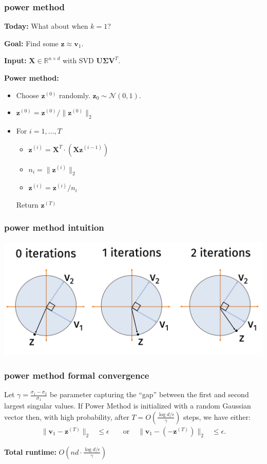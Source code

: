 \documentclass[compress]{beamer}
\newcommand{\bs}[1]{\boldsymbol{#1}}
\newcommand{\bv}[1]{\mathbf{#1}}
\newcommand{\R}{\mathbb{R}}
\begin{document}
\begin{frame}[t]
	\frametitle{power method}
	\textbf{Today:} What about when $k = 1$? 
	
	\textbf{Goal:} Find some $\bv{z} \approx \bv{v}_1$. 
	
	\textbf{Input:} $\bv{X} \in \R^{n\times d}$ with SVD $\bv{U}\bs{\Sigma}\bv{V}^T$. 
	
	\vspace{2em}
	\textbf{Power method:}
	\begin{itemize}
		\item Choose $\bv{z}^{(0)}$ randomly. $\bv{z}_0 \sim \mathcal{N}(0,1)$.
		\item $\bv{z}^{(0)} = \bv{z}^{(0)} /\|\bv{z}^{(0)}\|_2$
		\item For $i = 1,\ldots, T$
		\begin{itemize}
			\item $\bv{z}^{(i)} = \bv{X}^T\cdot(\bv{X}\bv{z}^{(i-1)} )$
			\item $n_i = \|\bv{z}^{(i)}\|_2$
			\item $\bv{z}^{(i)}  = \bv{z}^{(i)} /n_i$
		\end{itemize}
	Return $\bv{z}^{(T)}$
	\end{itemize} 
\end{frame}

\begin{frame}[t]
	\frametitle{power method intuition}
	\begin{center}
		\includegraphics[width=\textwidth]{intuition.png}
	\end{center}
	
\end{frame}

\begin{frame}[t]
	\frametitle{power method formal convergence}	
	\begin{theorem}
		Let $\gamma = \frac{\sigma_1 - \sigma_2}{\sigma_1}$ be  parameter capturing the ``gap'' between the first and second largest singular values. If Power Method is initialized with a random Gaussian vector then, with high probability, after $T = O\left(\frac{\log d/\epsilon}{\gamma}\right)$ steps, we have either:
		\begin{align*}
			\|\bv{v}_1 - \bv{z}^{(T)}\|_2 &\leq \epsilon &&\text{ or } &\|\bv{v}_1 - (-\bv{z}^{(T)})\|_2 &\leq \epsilon.
		\end{align*}
	\end{theorem}
	\alert{\textbf{Total runtime:}} $O\left(nd \cdot \frac{\log d/\epsilon}{\gamma}\right)$
\end{frame}
\end{document}
